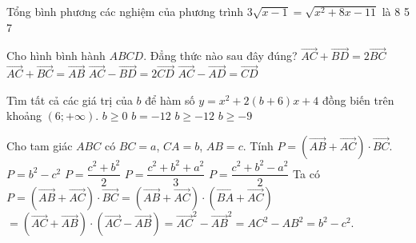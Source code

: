 \begin{ex}%
Tổng bình phương các nghiệm của  phương trình $3\sqrt{x-1}=\sqrt{x^2+8x-11}$ là
\choice
{}
{8}
{5}
{7}
\end{ex}

\begin{ex}%
Cho hình bình hành $ABCD$. Đẳng thức nào sau đây đúng?
\choice
{\True $\overrightarrow{AC}+\overrightarrow{BD}=2\overrightarrow{BC}$}
{$\overrightarrow{AC}+\overrightarrow{BC}=\overrightarrow{AB}$}
{$\overrightarrow{AC}-\overrightarrow{BD}=2\overrightarrow{CD}$}
{$\overrightarrow{AC}-\overrightarrow{AD}=\overrightarrow{CD}$}
\end{ex}

\begin{ex}%
Tìm tất cả các giá trị của $b$ để hàm số $y=x^2+2(b+6)x+4$ đồng biến trên khoảng $(6;+\infty).$
\choice
{$b \geq 0$}
{$b=-12$}
{\True $b \geq -12$}
{$b \geq -9$}
\end{ex}

\begin{ex}%
Cho tam giác $ABC$ có $BC=a$, $CA=b$, $AB=c$. Tính $P=(\overrightarrow{AB}+\overrightarrow{AC} )\cdot\overrightarrow{BC}$.
\choice
{\True $P=b^2-c^2$}
{$P=\dfrac{c^2+b^2}{2}$}
{$P=\dfrac{c^2+b^2+a^2}{3}$}
{$P=\dfrac{c^2+b^2-a^2}{2}$}
\loigiai
{Ta có $P=(\overrightarrow{AB}+\overrightarrow{AC} )\cdot\overrightarrow{BC}=(\overrightarrow{AB}+\overrightarrow{AC} )\cdot (\overrightarrow{BA}+\overrightarrow{AC} )$\\
$=(\overrightarrow{AC}+\overrightarrow{AB} )\cdot (\overrightarrow{AC}-\overrightarrow{AB} )={{\overrightarrow{AC}}^2}-\overrightarrow{AB}^2=AC^2-AB^2=b^2-c^2$.}
\end{ex}

